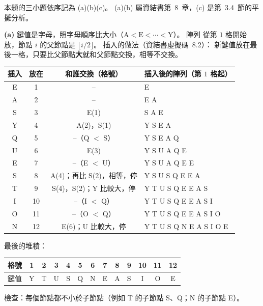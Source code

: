 \begin{pastsoln}
本題的三小題依序記為 (a)(b)(c)。 (a)(b) 屬資結書第~8~章，(c) 是第~3.4~節的平攤分析。

\textbf{(a)} 鍵值是字母，照字母順序比大小（$\mathrm{A} < \mathrm{E} < \cdots < \mathrm{Y}$）。 陣列
從第 $1$ 格開始放，節點 $i$ 的父節點是 $\lfloor i/2 \rfloor$。 插入的做法（資結書虛擬碼~8.2）：
新鍵值放在最後一格，只要比父節點\textbf{大}就和父節點交換，相等不交換。

\begin{center}
\small
\begin{tabular}{cccl}
\toprule
插入 & 放在 & 和誰交換（格號） & 插入後的陣列（第 $1$ 格起） \\
\midrule
E & 1 & -- & E \\
A & 2 & -- & E A \\
S & 3 & E(1) & S A E \\
Y & 4 & A(2)，S(1) & Y S E A \\
Q & 5 & --（Q $<$ S） & Y S E A Q \\
U & 6 & E(3) & Y S U A Q E \\
E & 7 & --（E $<$ U） & Y S U A Q E E \\
S & 8 & A(4)；再比 S(2)，相等，停 & Y S U S Q E E A \\
T & 9 & S(4)，S(2)；Y 比較大，停 & Y T U S Q E E A S \\
I & 10 & --（I $<$ Q） & Y T U S Q E E A S I \\
O & 11 & --（O $<$ Q） & Y T U S Q E E A S I O \\
N & 12 & E(6)；U 比較大，停 & Y T U S Q N E A S I O E \\
\bottomrule
\end{tabular}
\end{center}

最後的堆積：
\begin{center}
\begin{tabular}{c*{12}{c}}
\toprule
格號 & 1 & 2 & 3 & 4 & 5 & 6 & 7 & 8 & 9 & 10 & 11 & 12 \\
\midrule
鍵值 & Y & T & U & S & Q & N & E & A & S & I & O & E \\
\bottomrule
\end{tabular}
\end{center}
\begin{center}
\end{center}
檢查：每個節點都不小於子節點（例如 T 的子節點 S、Q；N 的子節點 E）。


\end{pastsoln}
